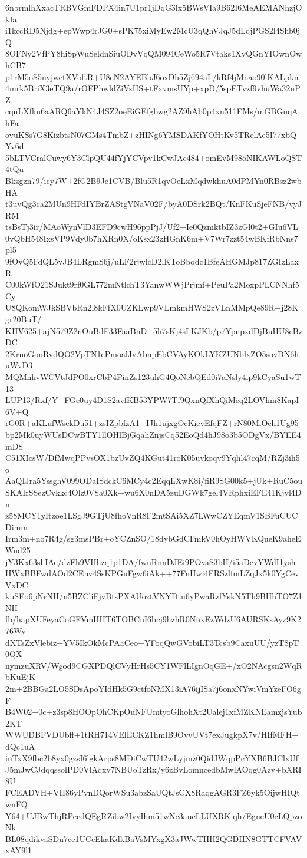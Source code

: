 6nbrmlhXxacTRBVGmFDPX4in7U1pr1jDqG3lx5BWsVIa9B62I6MeAEMANhzjOkIa
i1kccRD5Njdg+epWwp4rJG0+sPK75xiMyEw2McU3qQhVJqJ5dLqjPGS2l4Shb0jQ
8OFNv2VfPY8hiSpWuSeldnSiuODvVqQM094CeWo5R7Vtaks1XyQGnYIOwnOwhCB7
p1rM5oS5nyjwetXVoftR+U8eN2AYEBbJ6oxDh5Zj694aL/kRf4jMnao90lKALpkn
4mrk5BriX3eTQ9a/rOFPhwldZiVzHS+tFxvmsUYp+xpD/5spETvzf9vhuWa32uPZ
cqnLXfku6aARQ6aYkN4J4SZ2oeEiGEfgbwg2AZ9hAb0p4xn511EMs/mGBGuqAhFa
ovuKSs7G8KizbtsN07GMs4TmbZ+zHINg6YMSDAKfYOHtKv5TRelAe5I77xbQYv6d
5bLTVCralCuwy6Y3ClpQU44fYjYCVpv1kCwJAc484+omEvM98oNIKAWLoQST4tQu
Bkzgzn79/icy7W+2fG2B9Je1CVB/Blu5R1qvOeLxMqdwkhuA0dPMYn0RBsz2wbHA
t3uvQg3ca2MUn9HFdIYBrZAStgVNaV02F/byA0DSrk2BQt/KnFKuSjeFNB/vyJRM
tsBsTj3ir/MAoWynVlD3EFD9cwH96ppPjJ/Uf2+Ie0QzmktbIZ3zGl0t2+GIu6VL
0vQbH548IxsVP9Vdy0b7hXRn0X/oKsx23zHGnK6m+V7Wr7zzt54wBKfRbNns7pl5
9fOvQ5FdQL5vJB4LRgmS6j/uLF2rjwlcD2lKToBbodc1BfeAHGMJp817ZGIzLaxR
C00kWfO21SJukt9rf0GL772mNtlchT3YanwWWjPrjmf+PeuPa2MoxpPLCNNhf5Cy
U8QKomWJkSBVbRn2l8kFfX0UZKLwp9VLmkmHWS2zVLnMMpQe89R+j28Kgr20BuT/
KHV625+ajN579Z2nOuBdF33FaaBnD+5h7sKj4sLKJKb/p7YpnpxdDjBuHU8cBzDC
2KrnoGonRvdQO2VpTN1ePmoalJvAbnpEbCVAyKOkLYKZUNblxZO5sovDN6huWvD3
MQMnhvWCVtJdPO0xrCbP4PinZs123uhG4QoNebQEd0i7aNsly4ip9kCyaSu1wT13
LUP13/Rxf/Y+FGe0uy4D1S2avfKB53YPW7Tf9QxnQfXhQiMeq2LOVhm8KapI6V+Q
rG0R+aKLufWsekDu51+zsIZpbfzA1+IJh1ujxgOcKievEfqFZ+rN80MiOeh1Ug95
bp2Mk0uyWUsDCwBTY1llOHlBjGqahZnjsCq52EoQd4hJ98o3b5ODgVx/BYEE4mDS
C51XIcsW/DfMwqPPvsOX1bzUvZQ4KGut41roK05uvkoqv9Yqhl47cqM/RZj3ih5o
AaQIJra5YssghV099ODaISdckC6MCy4c2EqqLXwK8i/fiR9SG00k5+jUk+RuC5ou
SKAIrSSezCvkkc4Olz0VSa0Xk+wu6X0nDA5zuDGWk7gel4VRphxiEFE41Kjvl4Dn
z58MCY1yItzoe1LSgJ9GTjU8fhoVnR8F2mtSAi5XZ7LWwCZYEqmV1SBFuCUCDimm
Irm3m+no7R4g/sg3msPBr+oYCZnSO/18dybGdCFmkV0hOyHWVKQueK9aheEWud25
jY3Kx63sliIAe/dzFh9VHhzq1p1DA/fwnRnnDJEi9POvaS3bH/i5aDcvYWdI1ysh
HWxBBFwdAOd2CEnv4SsKPGuFgw6iAk++77FnHwi4FRSzlfmLZqJx5k0YgCevVxDC
kuSEo6pNrNH/n5BZCliFjvBtsPXAUoztVNYDtu6yPwaRzfYskN5Th9BHhTO7Z1NH
fb/hapXUFeyaCoGFVmHHT6TOBCnI6bcj9hzhR0NuxEzWdzU6AURSKsAyz9K276Wv
dXTsZxVlebiz+YV5IkOkMcPAaCeo+YFoqQwGVobiLT3Tcsb9CaxuUU/yzT8pT0QX
nymzuXRV/Wgod9CGXPDQlCVyHrHs5CY1WFlLIgnOqGE+/xO2NAcgsn2WqRbKuEjK
2m+2BBGa2LO5SDsApoYIdHk5G9ctfoNMX13iA76ijISa7j6onxNYwiVmYzeFO6gF
B4W02+0c+z3sp8HOOpOhCKpOuNFUmtyoGlhohXt2Ualej1xfMZKNEamzjsYub2KT
WWUDBFVDUbff+1tRH714VElECKZ1hmlB9OvvUVt7exJugkpX7v/HIfMFH+dQc1uA
iuTxX9fbc2b8yx0gzsI6lgkArps8MDiCwTU42wLyjmz0QidJWqpPcYXB6BJClxUf
J5mJwCJdqqssolPD0VlAqxv7NBUoTzRx/y6zBvLomncedbMwlAOqg0Azv+bXRI8U
FCEADVH+VII86yPvnDQorWSu3abzSaUQtJsCX8RaqgAGR3FZ6yk5OijwHIQtwnFQ
Y64+UJBwThjRPecdQEgRZibw2IvyIhm51wNc3aucLLUXRKiqh/EgneU0cLQpzoNk
BL08qdikvaSDu7ce1UCcEkaKdkBaVsMYxgX3aJWwTHH2QGDHN8GTTCFVAVxAY9l1
